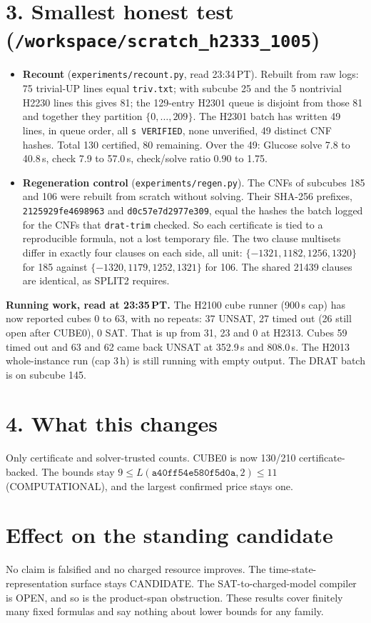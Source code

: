 \documentclass[11pt]{article}
\begin{document}
\section*{3. Smallest honest test (\texttt{/workspace/scratch\_h2333\_1005})}
\begin{itemize}
\item \textbf{Recount} (\texttt{experiments/recount.py}, read 23:34\,PT). Rebuilt from raw logs: 75 trivial-UP lines equal \texttt{triv.txt}; with subcube 25 and the 5 nontrivial H2230 lines this gives 81; the 129-entry H2301 queue is disjoint from those 81 and together they partition $\{0,\dots,209\}$. The H2301 batch has written 49 lines, in queue order, all \texttt{s VERIFIED}, none unverified, 49 distinct CNF hashes. Total 130 certified, 80 remaining. Over the 49: Glucose solve 7.8 to 40.8\,s, check 7.9 to 57.0\,s, check/solve ratio 0.90 to 1.75.
\item \textbf{Regeneration control} (\texttt{experiments/regen.py}). The CNFs of subcubes 185 and 106 were rebuilt from scratch without solving. Their SHA-256 prefixes, \texttt{2125929fe4698963} and \texttt{d0c57e7d2977e309}, equal the hashes the batch logged for the CNFs that \texttt{drat-trim} checked. So each certificate is tied to a reproducible formula, not a lost temporary file. The two clause multisets differ in exactly four clauses on each side, all unit: $\{-1321, 1182, 1256, 1320\}$ for 185 against $\{-1320, 1179, 1252, 1321\}$ for 106. The shared 21439 clauses are identical, as SPLIT2 requires.
\end{itemize}

\textbf{Running work, read at 23:35\,PT.} The H2100 cube runner (900\,s cap) has now reported cubes 0 to 63, with no repeats: 37 UNSAT, 27 timed out (26 still open after CUBE0), 0 SAT. That is up from 31, 23 and 0 at H2313. Cubes 59 timed out and 63 and 62 came back UNSAT at 352.9\,s and 808.0\,s. The H2013 whole-instance run (cap 3\,h) is still running with empty output. The DRAT batch is on subcube 145.

\section*{4. What this changes}
Only certificate and solver-trusted counts. CUBE0 is now 130/210 certificate-backed. The bounds stay $9\le L(\texttt{a40ff54e580f5d0a},2)\le 11$ (COMPUTATIONAL), and the largest confirmed price stays one.

\section*{Effect on the standing candidate}
No claim is falsified and no charged resource improves. The time-state-representation surface stays CANDIDATE. The SAT-to-charged-model compiler is OPEN, and so is the product-span obstruction. These results cover finitely many fixed formulas and say nothing about lower bounds for any family.
\end{document}
